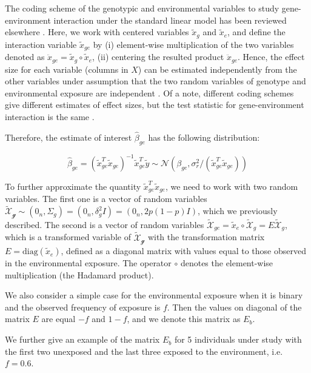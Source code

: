 \documentclass[]{book}
\begin{document}
The coding scheme of the genotypic and environmental variables to study
gene-environment interaction under the standard linear model has been
reviewed elsewhere \citep{Aschard2016}. Here, we work with centered
variables \(\tilde{x}_g\) and \(\tilde{x}_e\), and define the
interaction variable \(\tilde{x}_{ge}\) by (i) element-wise
multiplication of the two variables denoted as
\(\ddot{x}_{ge} = \tilde{x}_g \circ \tilde{x}_e\), (ii) centering the
resulted product \(\ddot{x}_{ge}\). Hence, the effect size for each
variable (columns in \(X\)) can be estimated independently from the
other variables under assumption that the two random variables of
genotype and environmental exposure are independent \citep[Appendix
C]{Aschard2016}. Of a note, different coding schemes give different
estimates of effect sizes, but the test statistic for gene-environment
interaction is the same \citep[Appendix B]{Aschard2016}.

Therefore, the estimate of interest \(\hat{\beta}_{ge}\) has the
following distribution:

\begin{equation}
  \hat{\beta}_{ge}  = \left(\tilde{x}_{ge}^T \tilde{x}_{ge}\right)^{-1} \tilde{x}_{ge}^T \tilde{y} \sim \mathcal{N} (\beta_{ge}, \sigma_r^2 / (\tilde{x}_{ge}^T \tilde{x}_{ge}))
\label{eq:betahatlmge}
\end{equation}

To further approximate the quantity \(\tilde{x}_{ge}^T \tilde{x}_{ge}\),
we need to work with two random variables. The first one is a vector of
random variables
\(\mathcal{\tilde{X}_g} \sim (0_n, \Sigma_g) = (0_n, \delta_g^2 I) = (0_n, 2 p (1-p) I)\),
which we previously described. The second is a vector of random
variables
\(\mathcal{\tilde{X}}_{ge} = \tilde{x}_e \circ \mathcal{\tilde{X}}_g = E \mathcal{\tilde{X}}_g\),
which is a transformed variable of \(\mathcal{\tilde{X}_g}\) with the
transformation matrix \(E = \mathrm{diag}(\tilde{x}_e)\), defined as a
diagonal matrix with values equal to those observed in the environmental
exposure. The operator \(\circ\) denotes the element-wise multiplication
(the Hadamard product).

We also consider a simple case for the environmental exposure when it is
binary and the observed frequency of exposure is \(f\). Then the values
on diagonal of the matrix \(E\) are equal \(-f\) and \(1 - f\), and we
denote this matrix as \(E_b\).

We further give an example of the matrix \(E_b\) for 5 individuals under
study with the first two unexposed and the last three exposed to the
environment, i.e. \(f = 0.6\).
\end{document}
